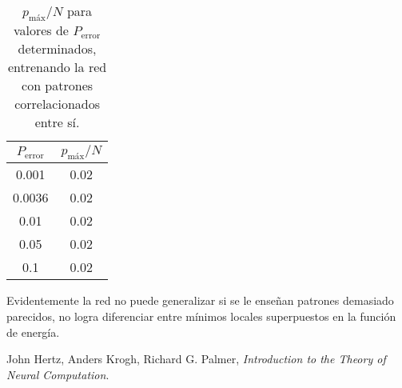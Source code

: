 \documentclass[a4paper,12pt]{article}
\begin{document}
\begin{table}[h]
    \centering
    \begin{tabular}{|c|c|}
        \hline
        $P_{\text{error}}$ & $p_{\text{máx}} / N$ \\
        \hline
        0.001 & 0.02 \\
        \hline
        0.0036 & 0.02 \\
        \hline
        0.01 & 0.02 \\
        \hline
        0.05 & 0.02 \\
        \hline
        0.1 & 0.02 \\
        \hline
    \end{tabular}
    \caption{$p_{\text{máx}} / N$ para valores de $P_{\text{error}}$ determinados, entrenando la red con patrones correlacionados entre sí.}
    \label{tab:tabla2}
\end{table}

Evidentemente la red no puede generalizar si se le enseñan patrones demasiado parecidos, no logra diferenciar entre mínimos locales superpuestos en la función de energía.

\begin{thebibliography}{9}

John Hertz, Anders Krogh, Richard G. Palmer, \textit{Introduction to the Theory of Neural Computation}.

\end{thebibliography}
\end{document}
